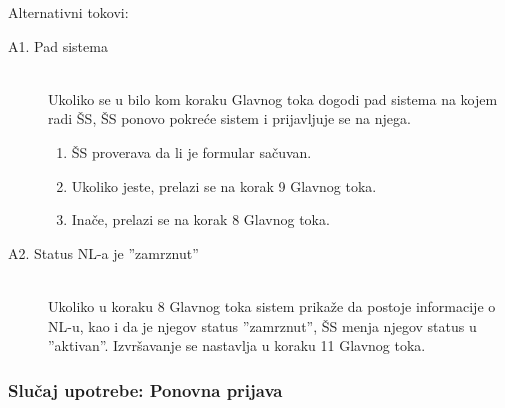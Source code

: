 \noindent Alternativni tokovi: 
\begin{description}
	\item[A1. Pad sistema] ~\\
	Ukoliko se u bilo kom koraku Glavnog toka dogodi pad sistema na kojem radi \v SS, \v SS ponovo pokre\'ce sistem i prijavljuje se na njega.
	\begin{enumerate}
		\item \v SS proverava da li je formular sa\v cuvan.
		\item Ukoliko jeste, prelazi se na korak 9 Glavnog toka.
		\item Ina\v ce, prelazi se na korak 8 Glavnog toka.
	\end{enumerate}

	\item[A2. Status NL-a je ''zamrznut''] ~\\
	Ukoliko u koraku 8 Glavnog toka sistem prika\v ze da postoje informacije o NL-u, kao i da je njegov status ''zamrznut'', \v SS menja njegov status u ''aktivan''. Izvr\v savanje se nastavlja u koraku 11 Glavnog toka.
\end{description}

\subsubsection{Slu\v caj upotrebe: Ponovna prijava}
\label{su: ponovna prijava}


